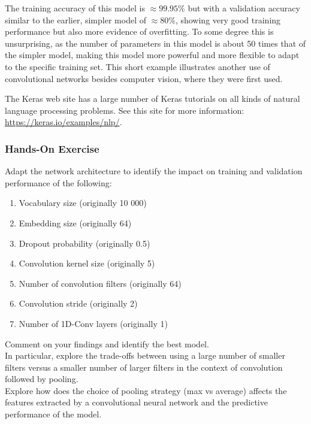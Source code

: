 The training accuracy of this model is $\approx 99.95\%$ but with a validation accuracy similar to the earlier, simpler model of $\approx 80\%$, showing very good training performance but also more evidence of overfitting. To some degree this is unsurprising, as the number of parameters in this model is about 50 times that of the simpler model, making this model more powerful and more flexible to adapt to the specific training set. This short example illustrates another use of convolutional networks besides computer vision, where they were first used.

\begin{tcolorbox}[colback=code]
The Keras web site has a large number of Keras tutorials on all kinds of natural language processing problems. See this site for more information: \footnotesize\url{https://keras.io/examples/nlp/}\normalsize.
\end{tcolorbox}


\begin{tcolorbox}[colback=code]
\subsubsection*{Hands-On Exercise} 
Adapt the network architecture to identify the impact on training and validation performance of the following:
   \begin{enumerate}
      \item Vocabulary size (originally 10 000)
      \item Embedding size (originally 64)
      \item Dropout probability (originally 0.5)
      \item Convolution kernel size (originally 5)
      \item Number of convolution filters (originally 64)
      \item Convolution stride (originally 2)
      \item Number of 1D-Conv layers (originally 1)
   \end{enumerate} 
Comment on your findings and identify the best model.\\
   
In particular, explore the trade-offs between using a large number of smaller filters versus a smaller number of larger filters in the context of convolution followed by pooling. \\

Explore how does the choice of pooling strategy (max vs average) affects the features extracted by a convolutional neural network and the predictive performance of the model.\\
\end{tcolorbox}

